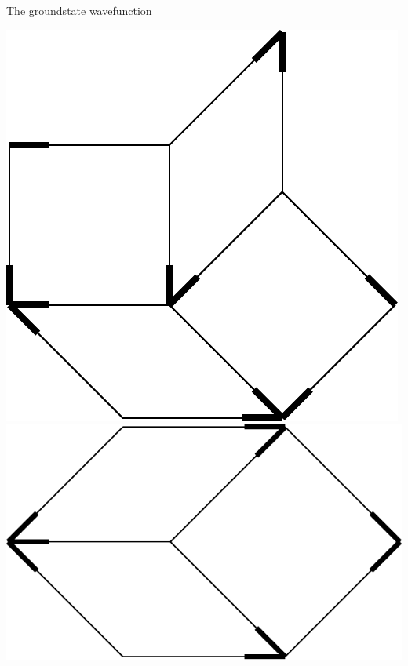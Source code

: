 \documentclass[xcolor=x11names,compress,professionalfonts, aspectratio=169]{beamer}
\renewcommand{\(}{\begin{columns}}
\renewcommand{\)}{\end{columns}}
\newcommand{\<}[1]{\begin{column}{#1}}
\renewcommand{\>}{\end{column}}
\begin{document}
\begin{frame}{The groundstate wavefunction}
{\includegraphics[scale=\s]{img/env_E.pdf}
\includegraphics[scale=\s]{img/env_F.pdf}

}

\end{frame}
\end{document}
